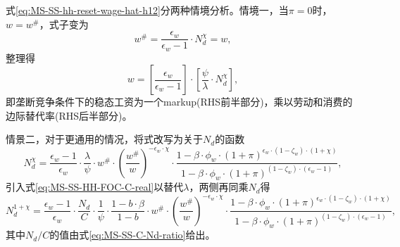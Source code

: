 \begin{enumerate}
式\eqref{eq:MS-SS-hh-reset-wage-hat-h12}分两种情境分析。情境一，当$\pi = 0$时，$w = w^{\#}$，式子变为
\begin{equation*}
w^{\#} = \frac{\epsilon_w}{\epsilon_w -1} \cdot N_d^{\chi} = w,
\end{equation*}
整理得
\begin{equation}
\label{eq:MS-SS-mono-wage-pricing}
w = \left[\frac{\epsilon_w}{\epsilon_w -1}\right] \cdot \left[ \frac{\psi}{\lambda} \cdot N_d^{\chi}\right],
\end{equation}
即垄断竞争条件下的稳态工资为一个markup(RHS前半部分)，乘以劳动和消费的边际替代率(RHS后半部分)。

情景二，对于更通用的情况，将式改写为关于$N_d$的函数
\begin{equation*}
N_d^{\chi} = \frac{\epsilon_w - 1}{\epsilon_w} \cdot \frac{\lambda }{\psi} \cdot w^{\#} \cdot \left(\frac{w^{\#}}{w}\right)^{-\epsilon_w \cdot \chi} \cdot \frac{
  1 - \beta \cdot \phi_w \cdot \left( 1 + \pi \right)^{\epsilon_w \cdot \left( 1 - \zeta_w \right) \cdot \left(1 + \chi \right)}
}{
  1 - \beta \cdot \phi_w \cdot \left( 1 + \pi \right)^{\left( 1 - \zeta_w \right) \cdot \left(\epsilon_w - 1 \right)}
  },
\end{equation*}
引入式\eqref{eq:MS-SS-HH-FOC-C-real}以替代$\lambda$，两侧再同乘$N_d$得
\begin{equation}
\label{eq:MS-SS-Nd-ratio}
N_d^{1+\chi} = \frac{\epsilon_w - 1}{\epsilon_w} \cdot \frac{N_d}{C} \cdot \frac{1}{\psi} \cdot \frac{1-b \cdot \beta}{1-b} \cdot w^{\#} \cdot \left(\frac{w^{\#}}{w}\right)^{-\epsilon_w \cdot \chi} \cdot \frac{
  1 - \beta \cdot \phi_w \cdot \left( 1 + \pi \right)^{\epsilon_w \cdot \left( 1 - \zeta_w \right) \cdot \left(1 + \chi \right)}
}{
  1 - \beta \cdot \phi_w \cdot \left( 1 + \pi \right)^{\left( 1 - \zeta_w \right) \cdot \left(\epsilon_w - 1 \right)}
  },
\end{equation}
其中$N_d/C$的值由式\eqref{eq:MS-SS-C-Nd-ratio}给出。


\end{enumerate}
